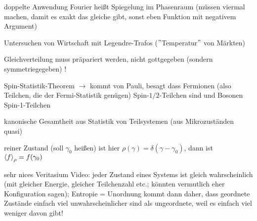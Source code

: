 doppelte Anwendung Fourier heißt Spiegelung im Phasenraum (müssen viermal machen, damit es exakt das gleiche gibt, sonst eben Funktion mit negativem Argument)

Untersuchen von Wirtschaft mit Legendre-Trafos ($"$Temperatur$"$ von Märkten)

Gleichverteilung muss präpariert werden, nicht gottgegeben (sondern symmetriegegeben) !

Spin-Statistik-Theorem $\rightarrow$ kommt von Pauli, besagt dass Fermionen (also Teilchen, die der Fermi-Statistik genügen) Spin-$1/2$-Teilchen sind und Bosonen Spin-1-Teilchen


kanonische Gesamtheit aus Statistik von Teilsystemen (aus Mikrozuständen quasi)

reiner Zustand (soll $\gamma_0$ heißen) ist hier $\rho(\gamma) = \delta(\gamma - \gamma_0)$, dann ist $\expval{f}_\rho = f(\gamma_0)$



sehr nices Veritasium Video: jeder Zustand eines Systems ist gleich wahrscheinlich (mit gleicher Energie, gleicher Teilchenzahl etc.; könnten vermutlich eher Konfiguration sagen); Entropie = Unordnung kommt dann daher, dass geordnete Zustände einfach viel unwahrscheinlicher sind als ungeordnete, weil es einfach viel weniger davon gibt!



